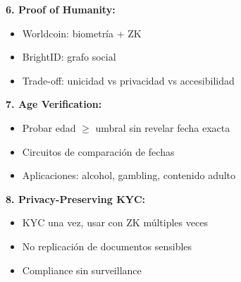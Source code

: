\documentclass[11pt,a4paper,twoside]{book}
\theoremstyle{definition}
\theoremstyle{remark}
\begin{document}
\begin{keyidea}
\textbf{6. Proof of Humanity:}
\begin{itemize}
    \item Worldcoin: biometría + ZK
    \item BrightID: grafo social
    \item Trade-off: unicidad vs privacidad vs accesibilidad
\end{itemize}

\textbf{7. Age Verification:}
\begin{itemize}
    \item Probar edad $\geq$ umbral sin revelar fecha exacta
    \item Circuitos de comparación de fechas
    \item Aplicaciones: alcohol, gambling, contenido adulto
\end{itemize}

\textbf{8. Privacy-Preserving KYC:}
\begin{itemize}
    \item KYC una vez, usar con ZK múltiples veces
    \item No replicación de documentos sensibles
    \item Compliance sin surveillance
\end{itemize}
\end{keyidea}
\end{document}
